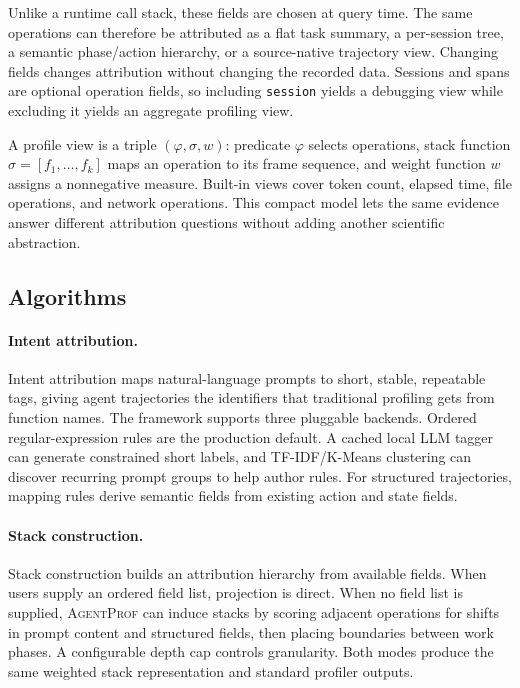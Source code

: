 \documentclass[letterpaper]{article}
\newcommand{\sys}{\textsc{AgentProf}\xspace}
\begin{document}
Unlike a runtime call stack, these fields are chosen at query time. The same
operations can therefore be attributed as a flat task summary, a per-session
tree, a semantic phase/action hierarchy, or a source-native trajectory view.
Changing fields changes attribution without changing the recorded data.
Sessions and spans are optional operation fields, so including
\texttt{session} yields a debugging view while excluding it yields an aggregate
profiling view.

A profile view is a triple $(\varphi,\sigma,w)$: predicate $\varphi$ selects
operations, stack function $\sigma=[f_1,\ldots,f_k]$ maps an operation to its
frame sequence, and weight function $w$ assigns a nonnegative measure. Built-in
views cover token count, elapsed time, file operations, and network operations.
This compact model lets the same evidence answer different attribution
questions without adding another scientific abstraction.

\subsection{Algorithms}
\label{sec:intent}

\paragraph{Intent attribution.}
Intent attribution maps natural-language prompts to short, stable, repeatable
tags, giving agent trajectories the identifiers that traditional profiling
gets from function names. The framework supports three pluggable backends.
Ordered regular-expression rules are the production default. A cached local
LLM tagger can generate constrained short labels, and TF-IDF/K-Means clustering
can discover recurring prompt groups to help author rules. For structured
trajectories, mapping rules derive semantic fields from existing action and
state fields.

\paragraph{Stack construction.}
Stack construction builds an attribution hierarchy from available fields. When
users supply an ordered field list, projection is direct. When no field list is
supplied, \sys can induce stacks by scoring adjacent operations for shifts in
prompt content and structured fields, then placing boundaries between work
phases. A configurable depth cap controls granularity. Both modes produce the
same weighted stack representation and standard profiler outputs.
\end{document}
